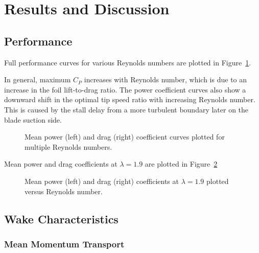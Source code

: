 \documentclass[energies,article,accept,moreauthors,pdftex,12pt,a4paper]{mdpi}
\begin{document}


\section{Results and Discussion}


\subsection{Performance}

Full performance curves for various Reynolds numbers are plotted in
Figure~\ref{fig:perf-curves}.


In general, maximum $C_P$ increases with Reynolds number, which is due to an
increase in the foil lift-to-drag ratio. The power coefficient curves also show
a downward shift in the optimal tip speed ratio with increasing Reynolds number.
This is caused by the stall delay from a more turbulent boundary later on the
blade suction side.

\begin{figure}[ht]
\caption{Mean power (left) and drag (right) coefficient curves plotted for
multiple Reynolds numbers.}
\label{fig:perf-curves}
\end{figure}

Mean power and drag coefficients at $\lambda=1.9$ are plotted in
Figure~\ref{fig:perf-Re-dep}

\begin{figure}[ht]
\caption{Mean power (left) and drag (right) coefficients at $\lambda=1.9$
plotted versus Reynolds number.} 
\label{fig:perf-Re-dep}
\end{figure}


\subsection{Wake Characteristics}




\subsubsection{Mean Momentum Transport}
\end{document}

